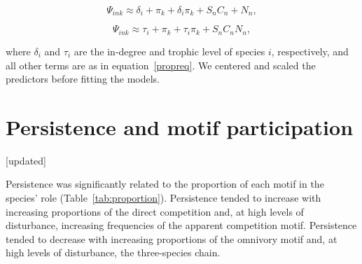 \documentclass[12pt]{article}
\begin{document}
\begin{spacing}{2.0}
      
            \begin{equation}
                    \Psi_{ink} \approx \delta_{i} + \pi_{k} + \delta_{i}\pi_{k} +
                    S_{n}C_{n} + N_n,
                    \label{degeq}
                \end{equation}
        
            \begin{equation}
                    \Psi_{ink} \approx \tau_{i} + \pi_{k} + \tau_{i}\pi_{k} +
                    S_{n}C_{n} N_n,
                    \label{TLeq}
                \end{equation}
        
            where $\delta_{i}$ and $\tau_i$ are the in-degree and trophic level of species $i$, respectively, and all other terms are as in equation~\ref{propreq}.
            We centered and scaled the predictors before fitting the models.

\clearpage

\section{Persistence and motif participation} [updated]

    Persistence was significantly related to the proportion of each motif in the species' role (Table~\ref{tab:proportion}). Persistence tended to increase with increasing proportions of the direct competition and, at high levels of disturbance, increasing frequencies of the apparent competition motif. Persistence tended to decrease with increasing proportions of the omnivory motif and, at high levels of disturbance, the three-species chain.


\end{spacing}
\end{document}
